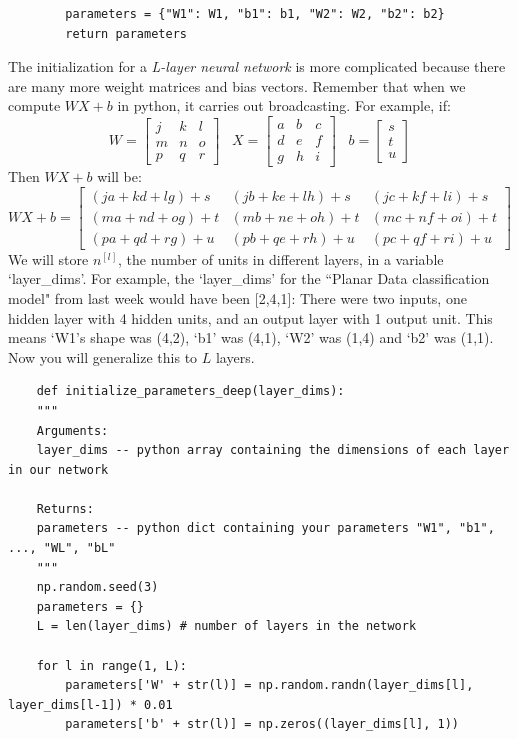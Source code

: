 \documentclass[11pt, a4paper]{article}
\begin{document}
\begin{spacing}{1.1}
\begin{lstlisting}
		parameters = {"W1": W1, "b1": b1, "W2": W2, "b2": b2}
		return parameters \end{lstlisting}
	The initialization for a \textit{L-layer neural network} is more complicated because there are many more weight matrices and bias vectors. Remember that when we compute $W X + b$ in python, it carries out broadcasting. For example, if: 	
	$$ W = \begin{bmatrix} j  & k  & l\\ m  & n & o \\ p  & q & r \end{bmatrix}\;\;\; X = \begin{bmatrix} a  & b  & c\\	d  & e & f \\
	g  & h & i \end{bmatrix} \;\;\; b =\begin{bmatrix}s  \\ t  \\ u \end{bmatrix}$$
	Then $WX + b$ will be:
	$$ WX + b = \begin{bmatrix} (ja + kd + lg) + s  & (jb + ke + lh) + s  & (jc + kf + li)+ s\\ (ma + nd + og) + t & (mb + ne + oh) + t & (mc + nf + oi) + t\\ (pa + qd + rg) + u & (pb + qe + rh) + u & (pc + qf + ri)+ u \end{bmatrix}  $$
	We will store $n^{[l]}$, the number of units in different layers, in a variable `layer\_dims'. For example, the `layer\_dims' for the ``Planar Data classification model" from last week would have been [2,4,1]: There were two inputs, one hidden layer with 4 hidden units, and an output layer with 1 output unit. This means `W1's shape was (4,2), `b1' was (4,1), `W2' was (1,4) and `b2' was (1,1). Now you will generalize this to $L$ layers. \newpage

	\begin{lstlisting}
	def initialize_parameters_deep(layer_dims):
	"""
	Arguments:
	layer_dims -- python array containing the dimensions of each layer in our network
	
	Returns:
	parameters -- python dict containing your parameters "W1", "b1", ..., "WL", "bL"
	"""
	np.random.seed(3)
	parameters = {}
	L = len(layer_dims) # number of layers in the network
	
	for l in range(1, L):
		parameters['W' + str(l)] = np.random.randn(layer_dims[l], layer_dims[l-1]) * 0.01
		parameters['b' + str(l)] = np.zeros((layer_dims[l], 1))


\end{lstlisting}
\end{spacing}
\end{document}
